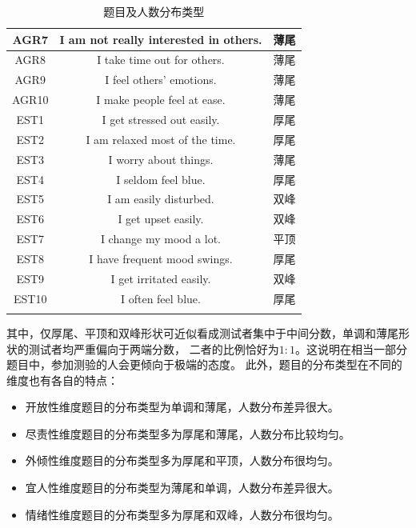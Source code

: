 \documentclass[UTF8]{ctexart}
\begin{document}
\begin{longtable}{c|c|c}
  AGR7         & I am not really interested in others.                    & 薄尾            \\\hline
  AGR8         & I take time out for others.                              & 薄尾            \\\hline
  AGR9         & I feel others' emotions.                                 & 薄尾            \\\hline
  AGR10        & I make people feel at ease.                              & 薄尾            \\\hline
  EST1         & I get stressed out easily.                               & 厚尾            \\\hline
  EST2         & I am relaxed most of the time.                           & 厚尾            \\\hline
  EST3         & I worry about things.                                    & 薄尾            \\\hline
  EST4         & I seldom feel blue.                                      & 厚尾            \\\hline
  EST5         & I am easily disturbed.                                   & 双峰            \\\hline
  EST6         & I get upset easily.                                      & 双峰            \\\hline
  EST7         & I change my mood a lot.                                  & 平顶            \\\hline
  EST8         & I have frequent mood swings.                             & 厚尾            \\\hline
  EST9         & I get irritated easily.                                  & 双峰            \\\hline
  EST10        & I often feel blue.                                       & 厚尾            \\\hline
  \caption{题目及人数分布类型}
  \label{type}
\end{longtable}
其中，仅厚尾、平顶和双峰形状可近似看成测试者集中于中间分数，单调和薄尾形状的测试者均严重偏向于两端分数，
二者的比例恰好为$1:1$。这说明在相当一部分题目中，参加测验的人会更倾向于极端的态度。
此外，题目的分布类型在不同的维度也有各自的特点：
\begin{itemize}
  \item 开放性维度题目的分布类型为单调和薄尾，人数分布差异很大。
  \item 尽责性维度题目的分布类型多为厚尾和薄尾，人数分布比较均匀。
  \item 外倾性维度题目的分布类型多为厚尾和平顶，人数分布很均匀。
  \item 宜人性维度题目的分布类型为薄尾和单调，人数分布差异很大。
  \item 情绪性维度题目的分布类型多为厚尾和双峰，人数分布很均匀。
\end{itemize}
\end{document}
